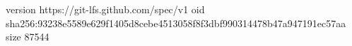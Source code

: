 version https://git-lfs.github.com/spec/v1
oid sha256:93238e5589e629f1405d8cebe4513058f8f3dbf990314478b47a947191ec57aa
size 87544
